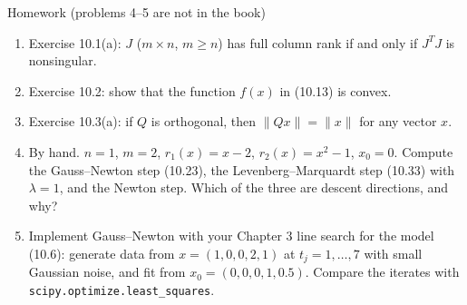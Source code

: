 \documentclass[aspectratio=169,12pt]{beamer}
\begin{document}
\begin{frame}{Homework {\normalfont\small(problems 4--5 are not in the book)}}
  \begin{enumerate}\setlength\itemsep{0.45em}
    \item Exercise 10.1(a): $J$ ($m\times n$, $m\ge n$) has full column rank if and only if $J^{T}J$ is nonsingular.
    \item Exercise 10.2: show that the function $f(x)$ in (10.13) is convex.
    \item Exercise 10.3(a): if $Q$ is orthogonal, then $\|Qx\|=\|x\|$ for any vector $x$.
    \item By hand. $n=1$, $m=2$, $r_{1}(x)=x-2$, $r_{2}(x)=x^{2}-1$, $x_{0}=0$. Compute the
      Gauss--Newton step (10.23), the Levenberg--Marquardt step (10.33) with $\lambda=1$, and the
      Newton step. Which of the three are descent directions, and why?
    \item Implement Gauss--Newton with your Chapter 3 line search for the model (10.6):
      generate data from $x=(1,0,0,2,1)$ at $t_{j}=1,\dots,7$ with small Gaussian noise, and fit
      from $x_{0}=(0,0,0,1,0.5)$. Compare the iterates with \texttt{scipy.optimize.least\_squares}.
  \end{enumerate}
\end{frame}
\end{document}
